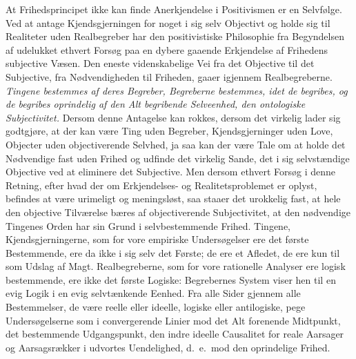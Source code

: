 \documentclass[12pt]{article}
\newcommand{\opage}[1]{\marginnote{\footnotesize\textit{[#1]}}}
\begin{document}
At Frihedsprincipet ikke kan finde Anerkjendelse i Positivismen er en
Selvfølge. Ved at antage Kjendsgjerningen for noget i sig selv
Objectivt og holde sig til Realiteter uden Realbegreber har den
positivistiske Philosophie fra Begyndelsen af udelukket ethvert Forsøg
paa en dybere gaaende Erkjendelse af Frihedens subjective Væsen. Den
eneste videnskabelige Vei fra det Objective til det Subjective, fra
Nødvendigheden til Friheden, gaaer igjennem Realbegreberne.
\emph{Tingene bestemmes
\opage{66} af deres Begreber, Begreberne bestemmes, idet de begribes, og de
begribes oprindelig af den Alt begribende Selveenhed, den ontologiske
Subjectivitet.} Dersom denne Antagelse kan rokkes, dersom det virkelig
lader sig godtgjøre, at der kan være Ting uden Begreber,
Kjendsgjerninger uden Love, Objecter uden objectiverende Selvhed, ja
saa kan der være Tale om at holde det Nødvendige fast uden Frihed og
udfinde det virkelig Sande, det i sig selvstændige Objective ved at
eliminere det Subjective. Men dersom ethvert Forsøg i denne Retning,
efter hvad der om Erkjendelses- og Realitetsproblemet er oplyst,
befindes at være urimeligt og meningsløst, saa staaer det urokkelig
fast, at hele den objective Tilværelse bæres af objectiverende
Subjectivitet, at den nødvendige Tingenes Orden har sin Grund i
selvbestemmende Frihed. Tingene, Kjendsgjerningerne, som for vore
empiriske Undersøgelser ere det første Bestemmende, ere da ikke i sig
selv det Første; de ere et Afledet, de ere kun til som Udslag af Magt.
Realbegreberne, som for vore rationelle Analyser ere logisk
bestemmende, ere ikke det første Logiske: Begrebernes System viser hen
til en evig Logik i en evig selvtænkende Eenhed. Fra alle Sider
gjennem alle Bestemmelser, de være reelle eller ideelle, logiske eller
antilogiske, pege Undersøgelserne som i convergerende Linier mod det
Alt forenende Midtpunkt, det bestemmende Udgangspunkt, den indre
ideelle Causalitet for reale Aarsager og Aarsagsrækker i udvortes
Uendelighed, d.\ e.\ mod den oprindelige Frihed.
\end{document}
